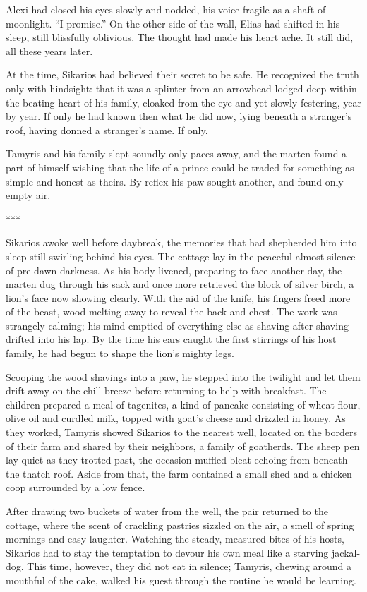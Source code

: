 Alexi had closed his eyes slowly and nodded, his voice fragile as a shaft of moonlight. ``I promise.'' On the other side of the wall, Elias had shifted in his sleep, still blissfully oblivious. The thought had made his heart ache. It still did, all these years later.

At the time, Sikarios had believed their secret to be safe. He recognized the truth only with hindsight: that it was a splinter from an arrowhead lodged deep within the beating heart of his family, cloaked from the eye and yet slowly festering, year by year. If only he had known then what he did now, lying beneath a stranger's roof, having donned a stranger's name. If only.

Tamyris and his family slept soundly only paces away, and the marten found a part of himself wishing that the life of a prince could be traded for something as simple and honest as theirs. By reflex his paw sought another, and found only empty air.

***

Sikarios awoke well before daybreak, the memories that had shepherded him into sleep still swirling behind his eyes. The cottage lay in the peaceful almost-silence of pre-dawn darkness. As his body livened, preparing to face another day, the marten dug through his sack and once more retrieved the block of silver birch, a lion's face now showing clearly. With the aid of the knife, his fingers freed more of the beast, wood melting away to reveal the back and chest. The work was strangely calming; his mind emptied of everything else as shaving after shaving drifted into his lap. By the time his ears caught the first stirrings of his host family, he had begun to shape the lion's mighty legs.

Scooping the wood shavings into a paw, he stepped into the twilight and let them drift away on the chill breeze before returning to help with breakfast. The children prepared a meal of tagenites, a kind of pancake consisting of wheat flour, olive oil and curdled milk, topped with goat's cheese and drizzled in honey. As they worked, Tamyris showed Sikarios to the nearest well, located on the borders of their farm and shared by their neighbors, a family of goatherds. The sheep pen lay quiet as they trotted past, the occasion muffled bleat echoing from beneath the thatch roof. Aside from that, the farm contained a small shed and a chicken coop surrounded by a low fence.

After drawing two buckets of water from the well, the pair returned to the cottage, where the scent of crackling pastries sizzled on the air, a smell of spring mornings and easy laughter. Watching the steady, measured bites of his hosts, Sikarios had to stay the temptation to devour his own meal like a starving jackal-dog. This time, however, they did not eat in silence; Tamyris, chewing around a mouthful of the cake, walked his guest through the routine he would be learning.

